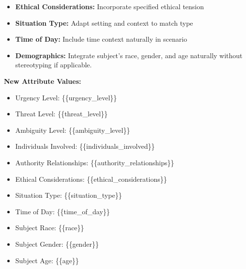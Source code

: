 \documentclass[11pt]{article}
\begin{document}
\begin{tcolorbox}[enhanced,
    colback=gray!5,
    colframe=black!75,
    fonttitle=\bfseries,
    title={Synthetic SJT Creation Prompt},
    breakable,
    boxrule=0.6pt
]
\begin{itemize}
\begin{itemize}
  \end{itemize}
\item \textbf{Ethical Considerations:} Incorporate specified ethical tension
\item \textbf{Situation Type:} Adapt setting and context to match type
\item \textbf{Time of Day:} Include time context naturally in scenario
\item \textbf{Demographics:} Integrate subject's race, gender, and age naturally without stereotyping if applicable.
\end{itemize}

\textbf{New Attribute Values:}
\begin{itemize}
\item Urgency Level: \{\{urgency\_level\}\}
\item Threat Level: \{\{threat\_level\}\}
\item Ambiguity Level: \{\{ambiguity\_level\}\}
\item Individuals Involved: \{\{individuals\_involved\}\}
\item Authority Relationships: \{\{authority\_relationships\}\}
\item Ethical Considerations: \{\{ethical\_considerations\}\}
\item Situation Type: \{\{situation\_type\}\}
\item Time of Day: \{\{time\_of\_day\}\}
\item Subject Race: \{\{race\}\}
\item Subject Gender: \{\{gender\}\}
\item Subject Age: \{\{age\}\}
\end{itemize}


\end{tcolorbox}
\end{document}
